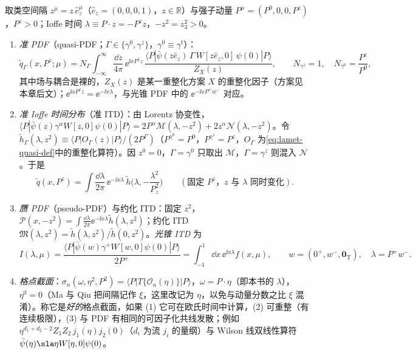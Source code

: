 \begin{definition}\label{def:lattice-quasi}
取类空间隔 $z^\mu=z\,\hat e_z^\mu$（$\hat e_z=(0,0,0,1)$，$z\in\mathbb R$）与强子动量 $P^\mu=(P^0,0,0,P^z)$，$P^z>0$；Ioffe 时间 $\lambda\equiv P\cdot z=-P^zz$，$-z^2=z_3^2>0$。
\begin{enumerate}[label=(\roman*),leftmargin=2em,itemsep=1pt,topsep=2pt]
\item \emph{准 PDF}（quasi-PDF；$\Gamma\in\{\gamma^0,\gamma^z\}$，$\gamma^0\equiv\gamma^t$）：
\begin{equation}\label{eq:lamet-quasi-def}
\tilde q_\Gamma(x,P^z;\mu)=N_\Gamma\int_{-\infty}^{\infty}\frac{\dd z}{4\pi}\,\ee^{\ii xP^zz}\,\frac{\langle P|\bar\psi(z\hat e_z)\,\Gamma\,W[z\hat e_z,0]\,\psi(0)|P\rangle}{Z_X(z)},\qquad N_{\gamma^z}=1,\quad N_{\gamma^0}=\frac{P^z}{P^0},
\end{equation}
其中场与耦合是裸的，$Z_X(z)$ 是某一重整化方案 $X$ 的重整化因子（方案见本章后文）；$\ee^{\ii xP^zz}=\ee^{-\ii x\lambda}$，与光锥 PDF 中的 $\ee^{-\ii xP^+w^-}$ 对应。%
\item \emph{准 Ioffe 时间分布}（准 ITD）：由 Lorentz 协变性，$\langle P|\bar\psi(z)\gamma^\alpha W[z,0]\psi(0)|P\rangle=2P^\alpha\mathcal M(\lambda,-z^2)+2z^\alpha\mathcal N(\lambda,-z^2)$。令 $\tilde h_\Gamma(\lambda,z^2)\equiv\langle P|O_\Gamma(z)|P\rangle/(2P^\Gamma)$（$P^{\gamma^0}=P^0$，$P^{\gamma^z}=P^z$，$O_\Gamma$ 为\cref{eq:lamet-quasi-def}中的重整化算符）。因 $z^0=0$，$\Gamma=\gamma^0$ 只取出 $\mathcal M$，$\Gamma=\gamma^z$ 则混入 $\mathcal N$。于是
\begin{equation}\label{eq:lamet-quasi-itd}
\tilde q(x,P^z)=\int\frac{\dd\lambda}{2\pi}\,\ee^{-\ii x\lambda}\,\tilde h\Big(\lambda,-\frac{\lambda^2}{P_z^2}\Big)\qquad(\text{固定 }P^z\text{，}z\text{ 与 }\lambda\text{ 同时变化}).
\end{equation}
\item \emph{赝 PDF}（pseudo-PDF）与约化 ITD：固定 $z^2$，$\mathcal P(x,-z^2)=\int\frac{\dd\lambda}{2\pi}\ee^{-\ii x\lambda}\tilde h(\lambda,z^2)$；约化 ITD $\mathfrak M(\lambda,z^2)=\tilde h(\lambda,z^2)/\tilde h(0,z^2)$。\emph{光锥 ITD} 为
\begin{equation}\label{eq:lamet-lc-itd}
I(\lambda,\mu)=\frac{\langle P|\bar\psi(w)\gamma^+W[w,0]\psi(0)|P\rangle}{2P^+}=\int_{-1}^1\dd x\,\ee^{\ii x\lambda}f(x,\mu),\qquad w=(0^+,w^-,\mathbf 0_{\mathrm T}),\quad\lambda=P^+w^-.
\end{equation}
\item \emph{格点截面}\cite{MaQiu2018}：$\sigma_n(\omega,\eta^2,P^2)=\langle P|T\{\mathcal O_n(\eta)\}|P\rangle$，$\omega=P\cdot\eta$（即本书的 $\lambda$），$\eta^0=0$（Ma 与 Qiu 把间隔记作 $\xi$，这里改记为 $\eta$，以免与动量分数之比 $\xi$ 混淆）。称它是\emph{好的}格点截面，如果 (1) 它可在欧氏时间中计算，(2) 可重整（有连续极限），(3) 与 PDF 有相同的可因子化共线发散；例如 $\eta^{d_1+d_2-2}Z_1Z_2\,j_1(\eta)j_2(0)$（$d_i$ 为流 $j_i$ 的量纲）与 Wilson 线双线性算符 $\bar\psi(\eta)\sla\eta W[\eta,0]\psi(0)$。

\end{enumerate}
\end{definition}
